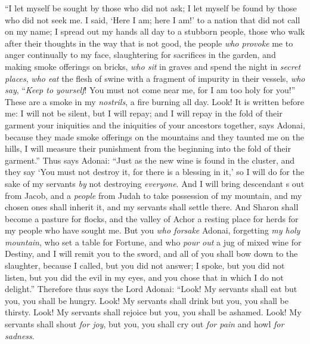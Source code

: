 \begin{biblechapter} %
 “I let myself be sought by those who did not ask; 
I let myself be found by those who did not seek me. 
I said, ‘Here I am; here I am!’ to a nation that did not call on my name;
\verse I spread out my hands all day to a stubborn people, 
those who walk after their thoughts in the way that is not good,
\verse the people \textit{who provoke} me to anger continually to my face, 
slaughtering for sacrifices in the garden, 
and making smoke offerings on bricks,
\verse \textit{who sit} in graves 
and spend the night in \textit{secret places}, 
\textit{who eat} the flesh of swine 
with a fragment of impurity in their vessels,
\verse \textit{who say}, “\textit{Keep to yourself}! 
You must not come near me, for I am too holy for you!” 
These are a smoke in my \textit{nostrils}, 
a fire burning all day.
\verse Look! It is written before me: I will not be silent, but I will repay; 
and I will repay in the fold of their garment
\verse your iniquities and the iniquities of your ancestors together, says Adonai, 
because they made smoke offerings on the mountains 
and they taunted me on the hills, 
I will measure their punishment from the beginning into the fold of their garment.”
\verse Thus says Adonai: “Just as the new wine is found in the cluster, and they say ‘You must not destroy it, for there is a blessing in it,’ so I will do for the sake of my servants \textit{by} not destroying \textit{everyone}.
\verse And I will bring descendant s out from Jacob, 
and a \textit{people} from Judah to take possession of my mountain, 
and my chosen ones shall inherit it, 
and my servants shall settle there.
\verse And Sharon shall become a pasture for flocks, 
and the valley of Achor a resting place for herds 
for my people who have sought me.
\verse But you \textit{who forsake} Adonai, 
forgetting \textit{my holy mountain}, 
who set a table for Fortune, 
and who \textit{pour out} a jug of mixed wine for Destiny,
\verse and I will remit you to the sword, 
and all of you shall bow down to the slaughter, 
because I called, but you did not answer; 
I spoke, but you did not listen, 
but you did the evil in my eyes, 
and you chose that in which I do not delight.”
\verse Therefore thus says the Lord Adonai:
\verse “Look! My servants shall eat but you, you shall be hungry. 
Look! My servants shall drink but you, you shall be thirsty. 
Look! My servants shall rejoice but you, you shall be ashamed.
\verse Look! My servants shall shout \textit{for joy}, but you, you shall cry out \textit{for pain} and howl \textit{for sadness}.

\end{biblechapter}
